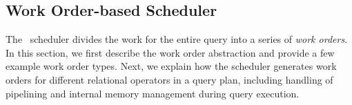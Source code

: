 
%
%
%

\subsection{Work Order-based Scheduler}\label{scheduler}
The \Quickstep\ scheduler divides the work for the entire query into a series of \textit{work orders}. In this section,
we first describe the work order abstraction and provide a few example work order types. Next, we explain how the scheduler generates work orders for different relational operators in a query plan, including handling of pipelining and internal memory management during query execution.

